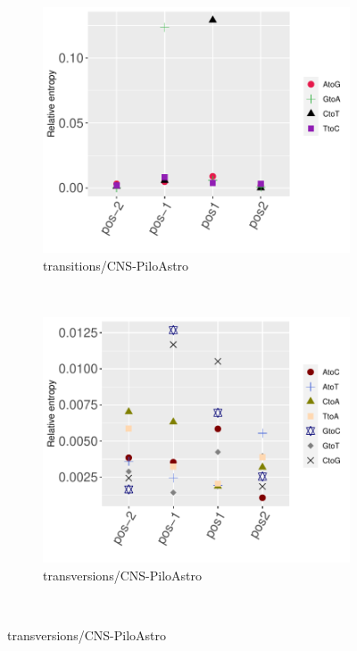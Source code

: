 \begin{figure}[ht!]\ContinuedFloat
    \begin{subfigure}{.5\textwidth}
    \includegraphics[scale=0.63]{graphics/nbr_transitions_CNS-PiloAstro.pdf}
    \caption{transitions/CNS-PiloAstro}
    \label{fig:transitions_cns-piloastro}
    \end{subfigure}
    ~
    \begin{subfigure}{.5\textwidth}
    \includegraphics[scale=0.63]{graphics/nbr_transversion_CNS-PiloAstro.pdf}
    \caption{transversions/CNS-PiloAstro}
    \label{fig:transversions_cns-piloastro}
    \end{subfigure} \\
    \vspace{0.5cm}
    

\end{figure}
